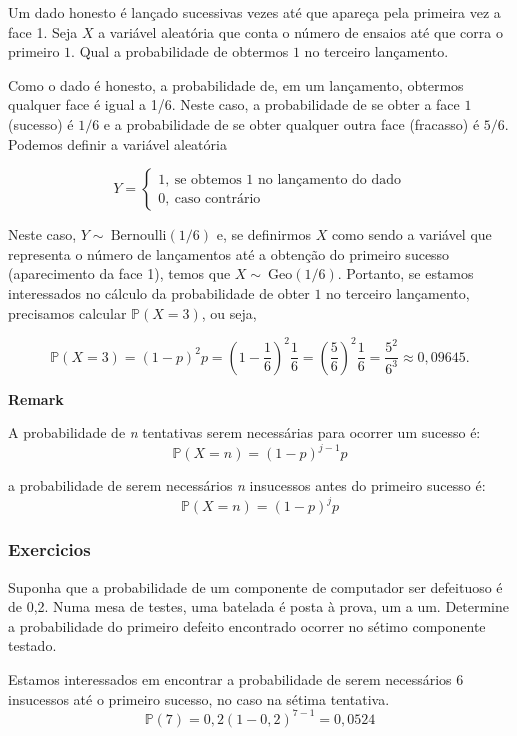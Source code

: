 \documentclass[10pt,a4paper]{article}
\begin{document}
\begin{eg}
	Um dado honesto é lançado sucessivas vezes até que apareça pela primeira vez a face 1. Seja $ X $ a variável aleatória que conta o número de ensaios até que corra o primeiro $ 1 $. Qual a probabilidade de obtermos $ 1 $ no terceiro lançamento.
\end{eg}
\begin{sol}
Como o dado é honesto, a probabilidade de, em um lançamento, obtermos qualquer face é igual a 1/6. Neste caso, a probabilidade de se obter a face $ 1 $ (sucesso) é $ 1/6 $ e a probabilidade de se obter qualquer outra face (fracasso) é $ 5/6 $. Podemos definir a variável aleatória


\[Y = \left\{\begin{array}{l}1, \ \text{se obtemos 1 no lançamento do dado}\\0, \ \text{caso contrário}\end{array}\right.\] 	

 

Neste caso, $ Y\sim \ \text{Bernoulli}(1/6) $ e, se definirmos $ X $ como sendo a variável que representa o número de lançamentos até a obtenção do primeiro sucesso (aparecimento da face 1), temos que $ X \sim \ \text{Geo}(1/6) $. Portanto, se estamos interessados no cálculo da probabilidade de obter $ 1 $ no terceiro lançamento, precisamos calcular $ \mathbb{P}(X = 3) $, ou seja,


\[\mathbb{P}(X=3)=(1-p)^2p=\left(1-\frac{1}{6}\right)^2\frac{1}{6}=\left(\frac{5}{6}\right)^2\frac{1}{6}=\frac{5^2}{6^3}\approx 0,09645.\]
\end{sol}
\begin{mdframed}[linewidth=0.6pt]
\textbf{Remark}

	A probabilidade de \textit{n} tentativas serem necessárias para ocorrer um sucesso é:
	\[\mathbb{P}(X=n) = (1-p)^{j-1}p\]

	a probabilidade de serem necessários \textit{n} insucessos antes do primeiro sucesso é:
	\[\mathbb{P}(X=n) = (1-p)^{j}p\]

\end{mdframed}

\subsubsection{Exercicios}

\begin{ex}
	Suponha que a probabilidade de um componente de computador ser defeituoso é de 0,2.  Numa mesa de testes, uma batelada é posta à prova, um a um.  Determine a probabilidade do primeiro defeito encontrado ocorrer no sétimo componente testado.
\end{ex}

\begin{sol}
	Estamos interessados em encontrar a probabilidade de serem necessários 6 insucessos até o primeiro sucesso, no caso na sétima tentativa.
	\[\mathbb{P}(7) = 0,2(1-0,2)^{7-1} = 0,0524\]
\end{sol}
\end{document}
